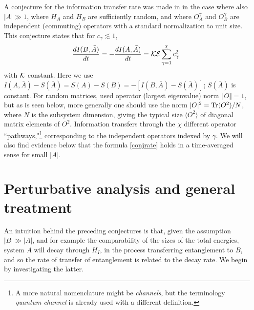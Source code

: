 \documentclass[aps,prd,groupedaddress,nofootinbib,letterpaper]{revtex4}
\newcommand{\cale}{{\cal E}}
\newcommand{\calk}{{\cal K}}
\newcommand{\beq}{\begin{equation}}
\newcommand{\eeq}{\end{equation}}
\newcommand{\abar}{{\bar A}}
\begin{document}
A conjecture for the information transfer rate was made in \cite{NVU} in the case where also $|A|\gg1$, where $H_A$ and $H_B$ are sufficiently random, and where $O^\gamma_A$ and $O^\gamma_B$ are  independent (commuting) operators with a standard normalization to unit size.  This conjecture states that for $c_\gamma\lesssim1$, 
\beq\label{conjrate}
\frac{dI(B,\abar)}{dt} = -\frac{dI(A,\abar)}{dt}= \calk \cale\sum_{\gamma=1}^\chi c_\gamma^2\ 
\eeq
with $\calk$  constant. Here we use $I(A,\abar)-S(\abar) = S(A)-S(B) = -[I(B,\abar)-S(\abar)]$; $S(\abar)$ is constant.  For random matrices, \cite{NVU} used operator (largest eigenvalue) norm $\Vert O\Vert=1$, but as is seen below, more generally one should use the norm $|O|^2= {\rm Tr}(O^2)/N$, where $N$ is the subsystem dimension, giving the typical size $\langle O^2\rangle$ of diagonal matrix elements of $O^2$. Information transfers through the $\chi$ different operator ``pathways,"\footnote{A more natural nomenclature might be {\it channels}, but the terminology {\it quantum channel} is already used with a different definition.} corresponding to the independent operators indexed by $\gamma$.  We will also find evidence below that the formula \eqref{conjrate}  holds in a time-averaged sense for small $|A|$.


\section{Perturbative analysis and general treatment}

An intuition behind the preceding conjectures is that, given the assumption $|B|\gg|A|$, and for example the comparability of the sizes of the total energies, system $A$ will decay through $H_I$, in the process transferring entanglement to $B$, and so the rate of transfer of entanglement is related to the decay rate.  We begin by investigating the latter.
\end{document}
